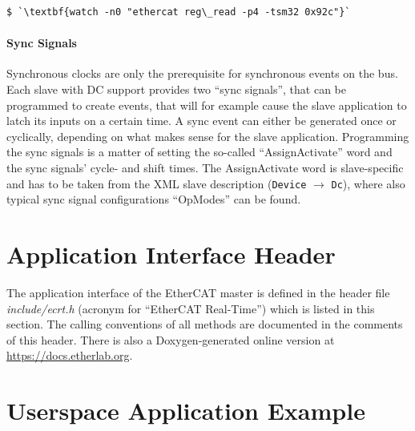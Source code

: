 \documentclass[a4paper,12pt,BCOR=6mm,bibtotoc,idxtotoc]{scrbook}
\begin{document}
\begin{lstlisting}
$ `\textbf{watch -n0 "ethercat reg\_read -p4 -tsm32 0x92c"}`
\end{lstlisting}

\paragraph{Sync Signals} Synchronous clocks are only the prerequisite for
synchronous events on the bus. Each slave with DC support provides two ``sync
signals'', that can be programmed to create events, that will for example
cause the slave application to latch its inputs on a certain time. A sync
event can either be generated once or cyclically, depending on what makes
sense for the slave application. Programming the sync signals is a matter of
setting the so-called ``AssignActivate'' word and the sync signals' cycle- and
shift times. The AssignActivate word is slave-specific and has to be taken
from the XML slave description (\lstinline+Device+ $\rightarrow$
\lstinline+Dc+), where also typical sync signal configurations ``OpModes'' can
be found.


\section{Application Interface Header}
\label{sec:ecrt}

The application interface of the EtherCAT master is defined in the header file
\textit{include/ecrt.h} (acronym for ``EtherCAT Real-Time'') which is listed
in this section. The calling conventions of all methods are documented in the
comments of this header. There is also a Doxygen-generated \cite{doxygen}
online version at \url{https://docs.etherlab.org}.




\section{Userspace Application Example}
\label{sec:example}
\end{document}

